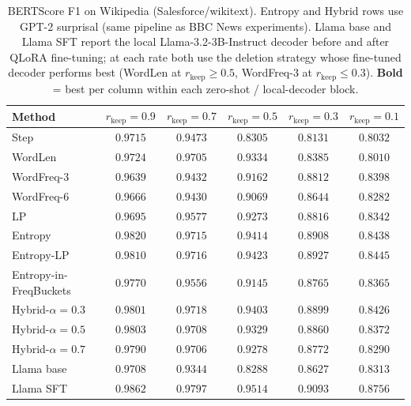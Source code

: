 \documentclass[11pt]{article}
\newcommand{\rkeep}{r_{\mathrm{keep}}}
\begin{document}
\begin{table}[tbp]
\centering
\small
\caption{BERTScore F1 on Wikipedia (Salesforce/wikitext).
Entropy and Hybrid rows use GPT-2 surprisal (same pipeline as BBC News experiments).
Llama base and Llama SFT report the local Llama-3.2-3B-Instruct decoder before and after QLoRA fine-tuning; at each rate both use the deletion strategy whose fine-tuned decoder performs best (WordLen at $\rkeep \ge 0.5$, WordFreq-3 at $\rkeep \le 0.3$).
\textbf{Bold} = best per column within each zero-shot / local-decoder block.}
\label{tab:wiki_bertscore}
\begin{tabular}{lccccc}
\toprule
\textbf{Method} & $\rkeep{=}0.9$ & $\rkeep{=}0.7$ & $\rkeep{=}0.5$ & $\rkeep{=}0.3$ & $\rkeep{=}0.1$ \\
\midrule
Step                    & $0.9715$ & $0.9473$ & $0.8305$ & $0.8131$ & $0.8032$ \\
WordLen                 & $0.9724$ & $0.9705$ & $0.9334$ & $0.8385$ & $0.8010$ \\
WordFreq-3               & $0.9639$ & $0.9432$ & $0.9162$ & $0.8812$ & $0.8398$ \\
WordFreq-6               & $0.9666$ & $0.9430$ & $0.9069$ & $0.8644$ & $0.8282$ \\
LP                  & $0.9695$ & $0.9577$ & $0.9273$ & $0.8816$ & $0.8342$ \\
Entropy                 & $\mathbf{0.9820}$ & $0.9715$ & $0.9414$ & $0.8908$ & $0.8438$ \\
Entropy-LP              & $0.9810$ & $0.9716$ & $\mathbf{0.9423}$ & $\mathbf{0.8927}$ & $\mathbf{0.8445}$ \\
Entropy-in-FreqBuckets  & $0.9770$ & $0.9556$ & $0.9145$ & $0.8765$ & $0.8365$ \\
Hybrid-$\alpha{=}0.3$   & $0.9801$ & $\mathbf{0.9718}$ & $0.9403$ & $0.8899$ & $0.8426$ \\
Hybrid-$\alpha{=}0.5$   & $0.9803$ & $0.9708$ & $0.9329$ & $0.8860$ & $0.8372$ \\
Hybrid-$\alpha{=}0.7$   & $0.9790$ & $0.9706$ & $0.9278$ & $0.8772$ & $0.8290$ \\
\midrule
Llama base              & $0.9708$ & $0.9344$ & $0.8288$ & $0.8627$ & $0.8313$ \\
Llama SFT               & $\mathbf{0.9862}$ & $\mathbf{0.9797}$ & $\mathbf{0.9514}$ & $\mathbf{0.9093}$ & $\mathbf{0.8756}$ \\
\bottomrule
\end{tabular}
\end{table}
\end{document}
